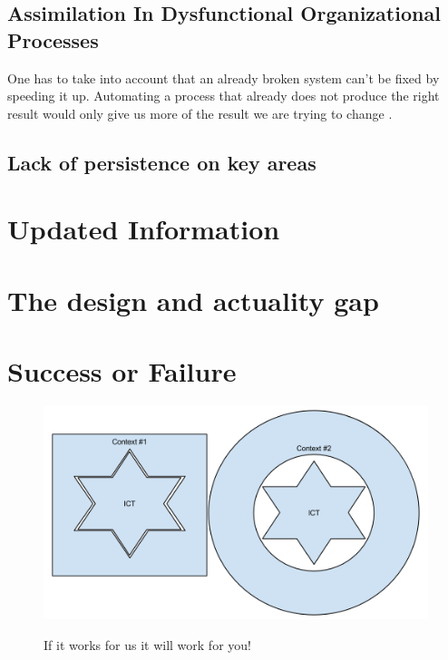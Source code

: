 \subsection{Assimilation In Dysfunctional Organizational Processes}
One has to take into account that an already broken system can't be fixed by speeding it up.
Automating a process that already does not produce the right result would only give us more of the result we are trying to change \cite{mh:rw}.

\subsection{Lack of persistence on key areas}

\section{Updated Information}

\section{The design and actuality gap}


\section{Success or Failure}

\begin{figure}
\centering
\includegraphics[width=\columnwidth]{literature/ict_in_dev/images/contextIctProblem.png}
\label{cip}
\caption{If it works for us it will work for you!}
\end{figure}


